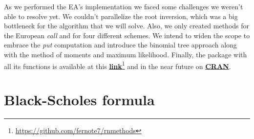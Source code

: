 \documentclass[12pt,twoside]{reedthesis}
\theoremstyle{definition}
\theoremstyle{definition}
\theoremstyle{remark}
\begin{document}
  As we performed the EA's implementation we faced some challenges we
  weren't able to resolve yet. We couldn't parallelize the root inversion,
  which was a big bottleneck for the algorithm that we will solve. Also,
  we only created methods for the European \emph{call} and for four
  different schemes. We intend to widen the scope to embrace the
  \emph{put} computation and introduce the binomial tree approach along
  with the method of moments and maximum likelihood. Finally, the package
  with all its functions is available at this
  \href{<https://github.com/fernote7/rnmethods>}{\textbf{link}}\footnote{\url{https://github.com/fernote7/rnmethods}}
  and in the near future on
  \href{<https://cran.r-project.org/>}{\textbf{CRAN}}.
  
  \appendix
  
  \chapter{Black-Scholes formula}\label{bsformula}
  
\end{document}
